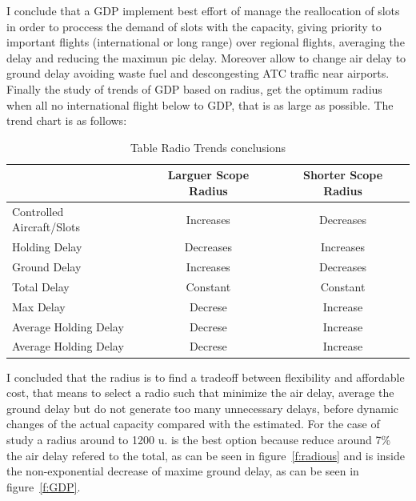 \documentclass[final,1p]{elsarticle}
\begin{document}
I conclude that a GDP implement best effort of manage the reallocation of slots in order to proccess the demand of slots with the capacity, giving priority to important flights (international or long range) over regional flights, averaging the delay and reducing the maximun pic delay. Moreover allow to change air delay to ground delay avoiding waste fuel and descongesting ATC traffic near airports.
\\

Finally the study of trends of GDP based on radius, get the optimum radius when all no international flight below to GDP, that is as large as possible. The trend chart is as follows:

\begin{table}[h]
\centering
\begin{tabular}{|l|c|c|}
\hline
&Larguer Scope Radius&Shorter Scope Radius\\
\hline
Controlled Aircraft/Slots & Increases& Decreases\\
\hline
Holding Delay& Decreases& Increases\\
\hline
Ground Delay& Increases& Decreases\\
\hline
Total Delay& Constant & Constant\\
\hline
Max Delay& Decrese & Increase\\
\hline
Average Holding Delay& Decrese & Increase\\
\hline
Average Holding Delay& Decrese & Increase\\
\hline
\end{tabular}
\caption{Table Radio Trends conclusions}
\label{tabla:table_trends}
\end{table}

I concluded that the radius is to find a tradeoff between flexibility and affordable cost, that means to select a radio such that minimize the air delay, average the ground delay but do not generate too many unnecessary delays, before dynamic changes of the actual capacity compared with the estimated. For the case of study a radius around to 1200 u. is the best option because reduce around 7\% the air delay refered to the total, as can be seen in figure~\ref{f:radious} and is inside the non-exponential decrease of maxime ground delay, as can be seen in figure~\ref{f:GDP}.
\end{document}
